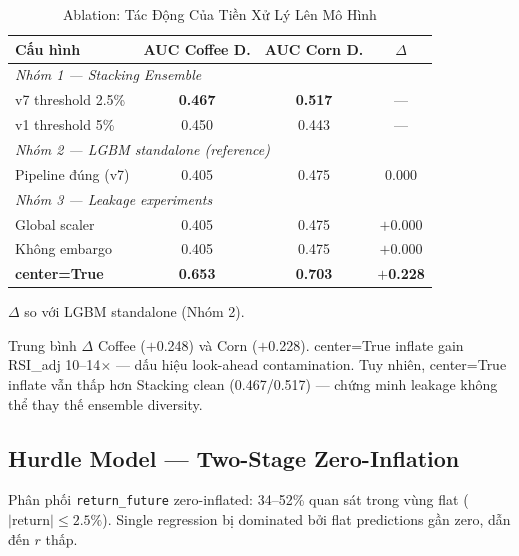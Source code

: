 \documentclass[conference]{IEEEtran}
\begin{document}
\begin{table}[htbp]
\caption{Ablation: Tác Động Của Tiền Xử Lý Lên Mô Hình}
\label{tab:ablation}
\centering
\begin{threeparttable}
\begin{tabular}{@{}lccc@{}}
\toprule
\textbf{Cấu hình} & \textbf{AUC Coffee D.} & \textbf{AUC Corn D.} & \textbf{$\Delta$\tnote{a}} \\
\midrule
\multicolumn{4}{l}{\textit{Nhóm 1 — Stacking Ensemble}} \\
v7 threshold 2.5\%  & \textbf{0.467} & \textbf{0.517} & --- \\
v1 threshold 5\%    & 0.450          & 0.443          & --- \\
\midrule
\multicolumn{4}{l}{\textit{Nhóm 2 — LGBM standalone (reference)}} \\
Pipeline đúng (v7)  & 0.405          & 0.475          & 0.000 \\
\midrule
\multicolumn{4}{l}{\textit{Nhóm 3 — Leakage experiments}} \\
Global scaler       & 0.405 & 0.475 & $+$0.000 \\
Không embargo       & 0.405 & 0.475 & $+$0.000 \\
\textbf{center=True}& \textbf{0.653} & \textbf{0.703} & $+$\textbf{0.228}\tnote{b} \\
\bottomrule
\end{tabular}
\begin{tablenotes}
\footnotesize
\item[a] $\Delta$ so với LGBM standalone (Nhóm 2).
\item[b] Trung bình $\Delta$ Coffee ($+$0.248) và Corn ($+$0.228). center=True
inflate gain RSI\_adj 10--14$\times$ — dấu hiệu look-ahead contamination.
Tuy nhiên, center=True inflate vẫn thấp hơn Stacking clean (0.467/0.517)
— chứng minh leakage không thể thay thế ensemble diversity.
\end{tablenotes}
\end{threeparttable}
\end{table}

\subsection{Hurdle Model — Two-Stage Zero-Inflation}

Phân phối \texttt{return\_future} zero-inflated: 34--52\% quan sát trong
vùng flat ($|\text{return}| \leq 2.5\%$). Single regression bị dominated bởi
flat predictions gần zero, dẫn đến $r$ thấp.
\end{document}
